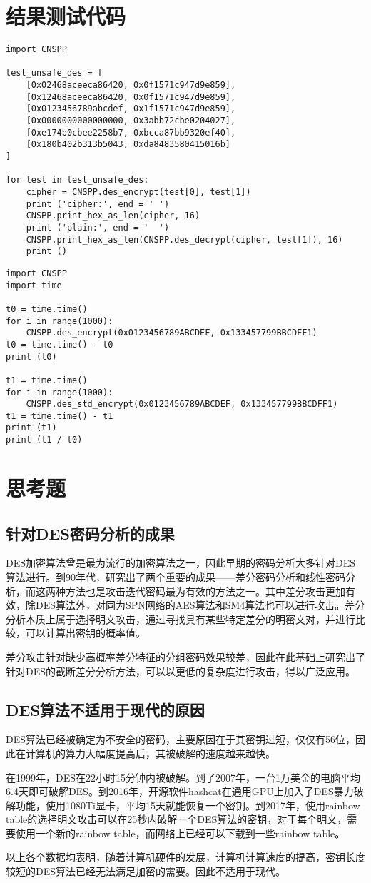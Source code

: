 \documentclass[a4paper, zihao=-4, UTF-8]{ctexart}
\begin{document}
	\section{结果测试代码}\label{apx:testcode}
	\begin{lstlisting}[caption={des\_test}, label={lst:destest}]
import CNSPP
		
test_unsafe_des = [
	[0x02468aceeca86420, 0x0f1571c947d9e859],
	[0x12468aceeca86420, 0x0f1571c947d9e859],
	[0x0123456789abcdef, 0x1f1571c947d9e859],
	[0x0000000000000000, 0x3abb72cbe0204027],
	[0xe174b0cbee2258b7, 0xbcca87bb9320ef40],
	[0x180b402b313b5043, 0xda8483580415016b]
]
		
for test in test_unsafe_des:
	cipher = CNSPP.des_encrypt(test[0], test[1])
	print ('cipher:', end = ' ')
	CNSPP.print_hex_as_len(cipher, 16)
	print ('plain:', end = '  ')
	CNSPP.print_hex_as_len(CNSPP.des_decrypt(cipher, test[1]), 16)
	print ()
	\end{lstlisting}
	\begin{lstlisting}[caption={des\_speed\_cmp}, label={lst:desspeedcmp}]
import CNSPP			
import time
	
t0 = time.time()
for i in range(1000):
	CNSPP.des_encrypt(0x0123456789ABCDEF, 0x133457799BBCDFF1)
t0 = time.time() - t0
print (t0)
	
t1 = time.time()
for i in range(1000):
	CNSPP.des_std_encrypt(0x0123456789ABCDEF, 0x133457799BBCDFF1)
t1 = time.time() - t1
print (t1)
print (t1 / t0)
	\end{lstlisting}
	\section{思考题}
	\subsection{针对DES密码分析的成果}
	DES加密算法曾是最为流行的加密算法之一，因此早期的密码分析大多针对DES算法进行。到90年代，研究出了两个重要的成果——差分密码分析和线性密码分析，而这两种方法也是攻击迭代密码最为有效的方法之一。其中差分攻击更加有效，除DES算法外，对同为SPN网络的AES算法和SM4算法也可以进行攻击。差分分析本质上属于选择明文攻击，通过寻找具有某些特定差分的明密文对，并进行比较，可以计算出密钥的概率值。
	\par 差分攻击针对缺少高概率差分特征的分组密码效果较差，因此在此基础上研究出了针对DES的截断差分分析方法，可以以更低的复杂度进行攻击，得以广泛应用。
	\subsection{DES算法不适用于现代的原因}
	DES算法已经被确定为不安全的密码，主要原因在于其密钥过短，仅仅有56位，因此在计算机的算力大幅度提高后，其被破解的速度越来越快。
	\par 在1999年，DES在22小时15分钟内被破解。到了2007年，一台1万美金的电脑平均6.4天即可破解DES。到2016年，开源软件hashcat在通用GPU上加入了DES暴力破解功能，使用1080Ti显卡，平均15天就能恢复一个密钥。到2017年，使用rainbow table的选择明文攻击可以在25秒内破解一个DES算法的密钥，对于每个明文，需要使用一个新的rainbow table，而网络上已经可以下载到一些rainbow table。
	\par 以上各个数据均表明，随着计算机硬件的发展，计算机计算速度的提高，密钥长度较短的DES算法已经无法满足加密的需要。因此不适用于现代。
\end{document}
